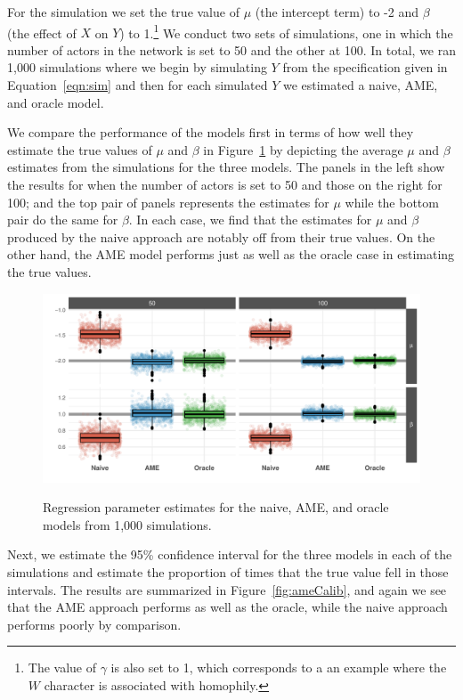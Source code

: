 For the simulation we set the true value of $\mu$ (the intercept term) to -2 and $\beta$ (the effect of $X$ on $Y$) to 1.\footnote{The value of $\gamma$ is also set to 1, which corresponds to a an example where the $W$ character is associated with homophily.} We conduct two sets of simulations, one in which the number of actors in the network is set to 50 and the other at 100. In total, we ran 1,000 simulations where we begin by simulating $Y$ from the specification given in Equation~\ref{eqn:sim} and then for each simulated $Y$ we estimated a naive, AME, and oracle model. 

We compare the performance of the models first in terms of how well they estimate the true values of $\mu$ and $\beta$ in Figure~\ref{fig:ameBias} by depicting the average $\mu$ and $\beta$ estimates from the simulations for the three models. The panels in the left show the results for when the number of actors is set to 50 and those on the right for 100; and the top pair of panels represents the estimates for $\mu$ while the bottom pair do the same for $\beta$. In each case, we find that the estimates for $\mu$ and $\beta$ produced by the naive approach are notably off from their true values. On the other hand, the AME model performs just as well as the oracle case in estimating the true values. 

\begin{figure}
	\centering
	\caption{Regression parameter estimates for the naive, AME, and oracle models from 1,000 simulations.}
	\label{fig:ameBias}
	\includegraphics[width=1\textwidth]{ameSimBias_all.pdf} \\
\end{figure}

Next, we estimate the 95\% confidence interval for the three models in each of the simulations and estimate the proportion of times that the true value fell in those intervals. The results are summarized in Figure~\ref{fig:ameCalib}, and again we see that the AME approach performs as well as the oracle, while the naive approach performs poorly by comparison. 

